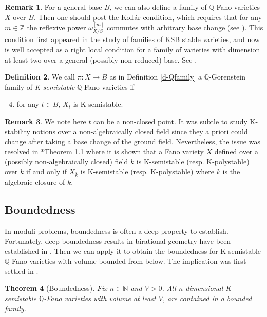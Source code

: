 \documentclass[12pt,reqno]{amsart}%
\newcommand{\Z}{{\mathbb{Z} }}
\newtheorem{thm}{Theorem}[section]
\theoremstyle{definition}
\newtheorem{defn}[thm]{Definition}
\newtheorem{rem}[thm]{Remark}
\theoremstyle{remark}
\newcommand{\bQ}{{\mathbb{Q}}}
\newcommand{\Q}{{\mathbb{Q}}}
\begin{document}
\begin{rem}
For a general base $B$, we can also define a family of $\bQ$-Fano varieties $X$ over $B$. Then one should post the Koll\'ar condition, which requires that for any $m\in \Z$ the reflexive power $\omega^{[m]}_{X/S}$ commutes with arbitrary base change (see \cite[24]{Kol08}).  This condition first appeared in the study of families of KSB stable varieties, and now is well accepted as a right local condition for a family of varieties with dimension at least two over a general (possibly non-reduced) base.  See \cite{Kol08,Kol21}.
\end{rem}

\begin{defn}\label{d-KsemiQfamily}
We call $\pi:X \to B$  as in Definition \ref{d-Qfamily} a $\Q$-Gorenstein family of \emph{K-semistable} $\bQ$-Fano varieties if
\begin{enumerate}
\setcounter{enumi}{3}
\item for any $t\in B$, $X_t$ is K-semistable. 
\end{enumerate}
\end{defn}
\begin{rem}
We note here $t$ can be a non-closed point. It was subtle to study K-stability notions over a non-algebraically closed field since they a priori could change after taking a base change of the ground field. Nevertheless, the issue was resolved in \cite{Zhu20}*{Theorem 1.1} where it is shown that a Fano variety $X$ defined over a (possibly non-algebraically closed) field $k$ is K-semistable (resp. K-polystable) over $k$ if and only if $X_{\bar{k}}$ is K-semistable (resp. K-polystable) where $\bar{k}$ is the algebraic closure of $k$.
\end{rem}


\subsection{Boundedness} In moduli problems, boundedness is often a deep property to establish. Fortunately, deep boundedness results in  birational geometry have been established in \cite{HMX14, Bir16, Bir19}. Then we can apply it to obtain the boundedness for K-semistable $\mathbb{Q}$-Fano varieties with volume bounded from below. The implication was first settled in \cite{Jia17}.

\begin{thm}[{Boundedness}]\label{t-boundedness}
Fix $n\in \mathbb N$ and $V>0$. 
All $n$-dimensional K-semistable $\mathbb{Q}$-Fano varieties with volume at least $V$, are contained in a bounded family. 
\end{thm} 
\end{document}
